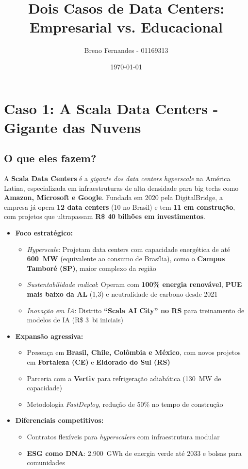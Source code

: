 \documentclass{article}
\title{Dois Casos de Data Centers: Empresarial vs. Educacional}
\author{Breno Fernandes - 01169313}
\date{\today}
\begin{document}
\maketitle

\section*{Caso 1: A Scala Data Centers - Gigante das Nuvens}

\subsection*{O que eles fazem?}
A \textbf{Scala Data Centers} é a \textit{gigante dos data centers hyperscale} na América Latina, especializada em infraestruturas de alta densidade para big techs como \textbf{Amazon, Microsoft e Google}. Fundada em 2020 pela DigitalBridge, a empresa já opera \textbf{12 data centers} (10 no Brasil) e tem \textbf{11 em construção}, com projetos que ultrapassam \textbf{R\$ 40 bilhões em investimentos}.

\begin{itemize}[leftmargin=*,noitemsep]
    \item \textbf{Foco estratégico:}
    \begin{itemize}[leftmargin=*,topsep=0pt]
        \item \textit{Hyperscale}: Projetam data centers com capacidade energética de até \textbf{600~MW} (equivalente ao consumo de Brasília), como o \textbf{Campus Tamboré (SP)}, maior complexo da região
        \item \textit{Sustentabilidade radical}: Operam com \textbf{100\% energia renovável}, \textbf{PUE mais baixo da AL} (1,3) e neutralidade de carbono desde 2021
        \item \textit{Inovação em IA}: Distrito \textbf{``Scala AI City'' no RS} para treinamento de modelos de IA (R\$ 3~bi iniciais)
    \end{itemize}
    
    \item \textbf{Expansão agressiva:}
    \begin{itemize}[leftmargin=*,topsep=0pt]
        \item Presença em \textbf{Brasil, Chile, Colômbia e México}, com novos projetos em \textbf{Fortaleza (CE)} e \textbf{Eldorado do Sul (RS)}
        \item Parceria com a \textbf{Vertiv} para refrigeração adiabática (130~MW de capacidade)
        \item Metodologia \textit{FastDeploy}, redução de 50\% no tempo de construção
    \end{itemize}
    
    \item \textbf{Diferenciais competitivos:}
    \begin{itemize}[leftmargin=*,topsep=0pt]
        \item Contratos flexíveis para \textit{hyperscalers} com infraestrutura modular
        \item \textbf{ESG como DNA}: 2.900~GWh de energia verde até 2033 e bolsas para comunidades
    \end{itemize}
\end{itemize}
\end{document}

